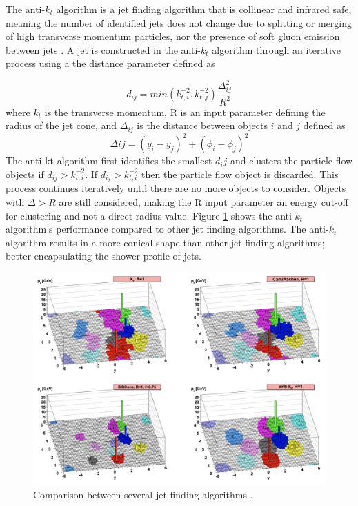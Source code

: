 		The anti-$k_t$ algorithm is a jet finding algorithm that is collinear and infrared safe, meaning the number of identified jets does not change due to splitting or merging of high transverse momentum particles, nor the presence of soft gluon emission between jets \cite{Cacciari_2008}. A jet is constructed in the anti-$k_t$ algorithm through an iterative process using a the distance parameter defined as 

		\begin{equation}\label{eqn:anti-kt-distance}
		d_{ij} = min(k_{t,i}^{-2} , k_{t,j}^{-2}) \frac{\Delta_{ij}^{2}}{R^2} 
		\end{equation}
		where $k_t$ is the transverse momentum, R is an input parameter defining the radius of the jet cone, and $\Delta_{ij}$ is the distance between objects $i$ and $j$ defined as
		\begin{equation}\label{eqn:anti-kt-delta}
		\Delta{ij} = (y_i - y_j)^2 + (\phi_i - \phi_j)^2
		\end{equation}
		The anti-kt algorithm first identifies the smallest $d_ij$ and clusters the particle flow objects if $d_{ij}>k_{t,i}^{-2}$. If $d_{ij}>k_{t,i}^{-2}$ then the particle flow object is discarded. This process continues iteratively until there are no more objects to consider. Objects with $\Delta>R$ are still considered, making the R input parameter an energy cut-off for clustering and not a direct radius value. Figure \ref{fig:anti-kt-comparison} shows the anti-$k_{t}$ algorithm's performance compared to other jet finding algorithms. The anti-$k_{t}$ algorithm results in a more conical shape than other jet finding algorithms; better encapsulating the shower profile of jets.

		\begin{figure}[!ht]
		\centering
		\includegraphics[width=.5\textwidth,keepaspectratio=true]{chapters/chapter5_eventreconnstruction/images/anti-kt-comparison.png}
		\caption{\label{fig:anti-kt-comparison} Comparison between several jet finding algorithms \cite{anti-kt}.}
		\end{figure}


